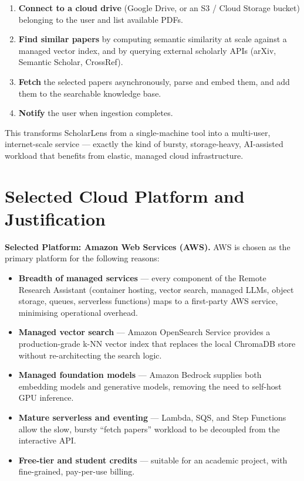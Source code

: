 \documentclass[12pt,a4paper]{article}
\begin{document}
\begin{enumerate}[leftmargin=2em, nosep]
    \item \textbf{Connect to a cloud drive} (Google Drive, or an S3 / Cloud
          Storage bucket) belonging to the user and list available PDFs.
    \item \textbf{Find similar papers} by computing semantic similarity at
          scale against a managed vector index, and by querying external
          scholarly APIs (arXiv, Semantic Scholar, CrossRef).
    \item \textbf{Fetch} the selected papers asynchronously, parse and embed
          them, and add them to the searchable knowledge base.
    \item \textbf{Notify} the user when ingestion completes.
\end{enumerate}

This transforms ScholarLens from a single-machine tool into a multi-user,
internet-scale service --- exactly the kind of bursty, storage-heavy,
AI-assisted workload that benefits from elastic, managed cloud infrastructure.

\section{Selected Cloud Platform and Justification}

\textbf{Selected Platform: Amazon Web Services (AWS).} AWS is chosen as the
primary platform for the following reasons:

\begin{itemize}[leftmargin=2em, nosep]
    \item \textbf{Breadth of managed services} --- every component of the
          Remote Research Assistant (container hosting, vector search, managed
          LLMs, object storage, queues, serverless functions) maps to a
          first-party AWS service, minimising operational overhead.
    \item \textbf{Managed vector search} --- Amazon OpenSearch Service
          provides a production-grade k-NN vector index that replaces the
          local ChromaDB store without re-architecting the search logic.
    \item \textbf{Managed foundation models} --- Amazon Bedrock supplies both
          embedding models and generative models, removing the need to
          self-host GPU inference.
    \item \textbf{Mature serverless and eventing} --- Lambda, SQS, and Step
          Functions allow the slow, bursty ``fetch papers'' workload to be
          decoupled from the interactive API.
    \item \textbf{Free-tier and student credits} --- suitable for an academic
          project, with fine-grained, pay-per-use billing.
\end{itemize}
\end{document}
